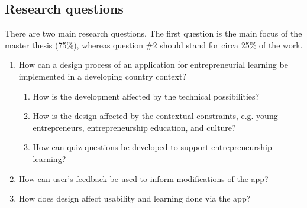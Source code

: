 \subsection{Research questions}

There are two main research questions. The first question is the main focus of the master thesis (75\%), whereas question \#2 should stand for circa 25\% of the work.

\begin{enumerate}
    \item How can a design process of an application for entrepreneurial learning be implemented in a developing country context? %
    \begin{enumerate}
        \item How is the development affected by the technical possibilities?
\item How is the design affected by the contextual  constraints, e.g. young entrepreneurs, entrepreneurship education, and culture? %
        \item How can quiz questions be developed to support entrepreneurship learning? %
    \end{enumerate}
    \item How can user’s feedback be used to inform modifications of the app?
    \item How does design affect usability and learning done via the app? %
	\end{enumerate}




